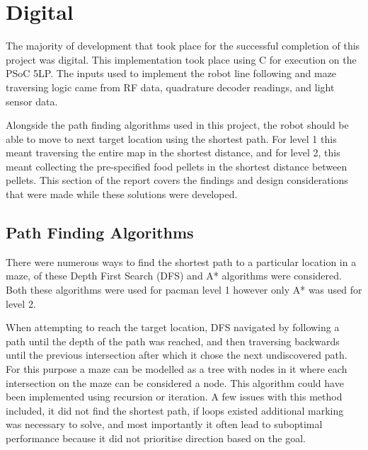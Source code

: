 \documentclass{article}
\begin{document}

\section{Digital}

The majority of development that took place for the successful completion of this project was digital. This implementation took place using C for execution on the PSoC 5LP. The inputs used to implement the robot line following and maze traversing logic came from RF data, quadrature decoder readings, and light sensor data. 

Alongside the path finding algorithms used in this project, the robot should be able to move to next target location using the shortest path. For level 1 this meant traversing the entire map in the shortest distance, and for level 2, this meant collecting the pre-specified food pellets in the shortest distance between pellets. This section of the report covers the findings and design considerations that were made while these solutions were developed.

\subsection{Path Finding Algorithms}

There were numerous ways to find the shortest path to a particular location in a maze, of these Depth First Search (DFS) and A* algorithms were considered. Both these algorithms were used for pacman level 1 however only A* was used for level 2. 

When attempting to reach the target location, DFS navigated by following a path until the depth of the path was reached, and then traversing backwards until the previous intersection after which it chose the next undiscovered path. For this purpose a maze can be modelled as a tree with nodes in it where each intersection on the maze can be considered a node. This algorithm could have been implemented using recursion or iteration. A few issues with this method included, it did not find the shortest path, if loops existed additional marking was necessary to solve, and most importantly it often lead to suboptimal performance because it did not prioritise direction based on the goal.
\end{document}
